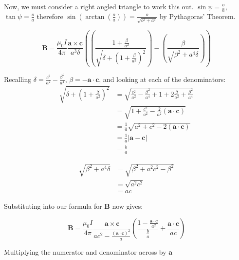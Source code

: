 Now, we must consider a right angled triangle to work this out. $\sin\psi = \frac{o}{h}$, $\tan\psi = \frac{o}{a}$ therefore $\sin\left( \arctan \left( \frac{o}{a} \right) \right) = \frac{o}{\sqrt{o^2 + a^2}}$ by Pythagoras' Theorem.

\begin{equation}
  \mathbf{B} = \frac{\mu_0 I}{4\pi} \frac{\mathbf{a} \times \mathbf{c}}{a^3\delta} \left( \left( \frac{1 + \frac{\beta}{a^2}}{\sqrt{\delta + \left( 1 + \frac{\beta}{a^2} \right)^2}} \right) - \left( \frac{\beta}{\sqrt{\beta^2 + a^4 \delta}} \right)  \right) 
\end{equation}

Recalling $\delta = \frac{c^2}{a^2} - \frac{\beta^2}{a^4}$, $\beta = -\mathbf{a} \cdot \mathbf{c}$, and looking at each of the denominators:
\begin{align*}
  \sqrt{\delta + \left( 1 + \frac{\beta}{a^2} \right)^2} &= \sqrt{\frac{c^2}{a^2} - \frac{\beta^2}{a^4} + 1 + 2\frac{\beta}{a^2} + \frac{\beta^2}{a^4}} \\
                             &= \sqrt{1 + \frac{c^2}{a^2} - \frac{2}{a^2} \left(\mathbf{a} \cdot \mathbf{c} \right)} \\
                             &= \frac{1}{a} \sqrt{a^2 + c^2 - 2\left(\mathbf{a} \cdot \mathbf{c}\right)} \\
                             &= \frac{1}{a} \left \vert \mathbf{a} - \mathbf{c} \right \vert \\
                             &= \frac{b}{a}
\end{align*}

\begin{align*}
  \sqrt{\beta^2 + a^4 \delta} &= \sqrt{\beta^2 + a^2c^2 - \beta^2} \\
                              &= \sqrt{a^2c^2} \\
                              &= ac
\end{align*}

Substituting into our formula for $\mathbf{B}$ now gives:

\begin{equation}
  \mathbf{B} = \frac{\mu_0 I}{4\pi} \frac{\mathbf{a}\times \mathbf{c}}{ac^2 - \frac{\left(\mathbf{a} \cdot \mathbf{c}\right)^2}{a}} \left( \frac{1 - \frac{\mathbf{a}\cdot{\mathbf{c}}}{a^2}}{\frac{b}{a}} + \frac{\mathbf{a} \cdot \mathbf{c}}{ac} \right)
\end{equation}

Multiplying the numerator and denominator across by $\mathbf{a}$

